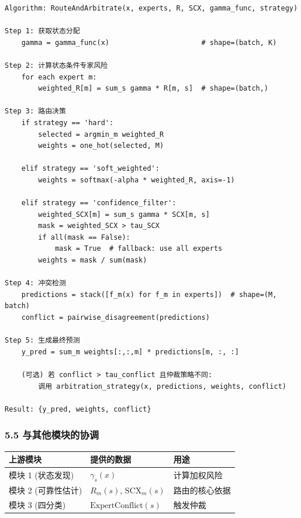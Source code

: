 \documentclass[
  12pt,
]{ctexart}
\begin{document}
\begin{verbatim}
Algorithm: RouteAndArbitrate(x, experts, R, SCX, gamma_func, strategy)

Step 1: 获取状态分配
    gamma = gamma_func(x)                      # shape=(batch, K)

Step 2: 计算状态条件专家风险
    for each expert m:
        weighted_R[m] = sum_s gamma * R[m, s]  # shape=(batch,)

Step 3: 路由决策
    if strategy == 'hard':
        selected = argmin_m weighted_R
        weights = one_hot(selected, M)

    elif strategy == 'soft_weighted':
        weights = softmax(-alpha * weighted_R, axis=-1)

    elif strategy == 'confidence_filter':
        weighted_SCX[m] = sum_s gamma * SCX[m, s]
        mask = weighted_SCX > tau_SCX
        if all(mask == False):
            mask = True  # fallback: use all experts
        weights = mask / sum(mask)

Step 4: 冲突检测
    predictions = stack([f_m(x) for f_m in experts])  # shape=(M, batch)
    conflict = pairwise_disagreement(predictions)

Step 5: 生成最终预测
    y_pred = sum_m weights[:,:,m] * predictions[m, :, :]

    (可选) 若 conflict > tau_conflict 且仲裁策略不同:
        调用 arbitration_strategy(x, predictions, weights, conflict)

Result: {y_pred, weights, conflict}
\end{verbatim}

\subsubsection{5.5
与其他模块的协调}\label{ux4e0eux5176ux4ed6ux6a21ux5757ux7684ux534fux8c03-4}

\begin{longtable}[]{@{}lll@{}}
\toprule\noalign{}
上游模块 & 提供的数据 & 用途 \\
\midrule\noalign{}
\endhead
\bottomrule\noalign{}
\endlastfoot
模块 1 (状态发现) & \(\gamma_s(x)\) & 计算加权风险 \\
模块 2 (可靠性估计) & \(R_m(s)\), \(\text{SCX}_m(s)\) &
路由的核心依据 \\
模块 3 (四分类) & \(\text{ExpertConflict}(s)\) & 触发仲裁 \\
\end{longtable}
\end{document}
